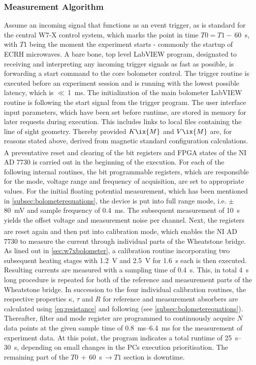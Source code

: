         \subsubsection*{Measurement Algorithm}%
%
            Assume an incoming signal that functions as an event trigger, as is standard for the central W7-X control system, which marks the point in time $T0=T1-\,$\SI{60}{\second}, with $T1$ being the moment the experiment starts - commonly the startup of ECRH microwaves\cite{Spring2017}. A bare bone, top level LabVIEW program, designated to receiving and interpreting any incoming trigger signals as fast as possible, is forwarding a start command to the core bolometer control. The trigger routine is executed before an experiment session and is running with the lowest possible latency, which is $\ll\,$\SI{1}{\milli\second}. The initialization of the main bolometer LabVIEW routine is following the start signal from the trigger program. The user interface input parameters, which have been set before runtime, are stored in memory for later requests during execution. This includes links to local files containing the line of sight geometry. Thereby provided $K\ix{M}$ and $V\ix{M}$ are, for reasons stated above, derived from magnetic standard configuration calculations.\\%
            A preventative reset and clearing of the bit registers and FPGA states of the NI\textsuperscript{\textregistered} AD 7730 is carried out in the beginning of the execution. For each of the following internal routines, the bit programmable registers, which are responsible for the mode, voltage range and frequency of acquisition, are set to appropriate values. For the initial floating potential measurement, which has been mentioned in \cref{subsec:bolometerequations}, the device is put into full range mode, i.e. $\pm\,$\SI{80}{\milli\volt} and sample frequency of \SI{0.4}{\milli\second}. The subsequent measurement of \SI{10}{\second} yields the offset voltage and measurement noise per channel. Next, the registers are reset again and then put into calibration mode, which enables the NI\textsuperscript{\textregistered} AD 7730 to measure the current through individual parts of the Wheatstone bridge. As lined out in \cref{sec:w7xbolometer}, a calibration routine incorporating two subsequent heating stages with \SI{1.2}{\volt} and \SI{2.5}{\volt} for \SI{1.6}{\second} each is then executed. Resulting currents are measured with a sampling time of \SI{0.4}{\second}. This, in total \SI{4}{\second} long procedure is repeated for both of the reference and measurement parts of the Wheatstone bridge. In succession to the four individual calibration routines, the respective properties $\kappa$, $\tau$ and $R$ for reference and measurement absorbers are calculated using \cref{eq:resistance} and following (see \cref{subsec:bolometerequations}). Thereafter, filter and mode register are programmed to continuously acquire $N$ data points at the given sample time of \SIrange{0.8}{6.4}{\milli\second} for the measurement of experiment data. At this point, the program indicates a total runtime of \SIrange{25}{30}{\second}, depending on small changes in the PCs execution prioritisation. The remaining part of the $T0\,+\,$\SI{60}{\second}$\,\rightarrow T1$ section is downtime.\\%
